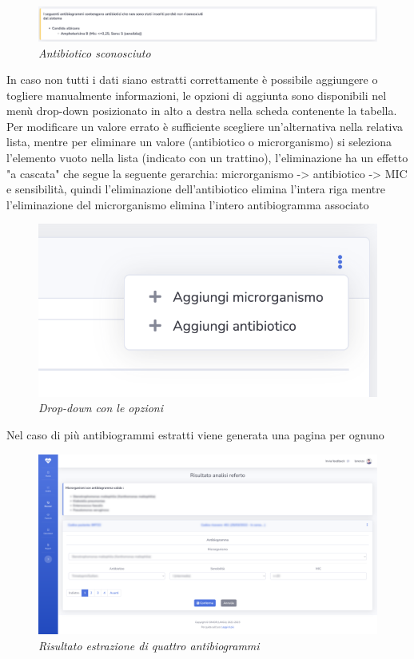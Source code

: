 \begin{figure}[h!]
	\centering
	\includegraphics[width=.99\columnwidth]{images/static_missing_antib.png}
	\caption{\textit{Antibiotico sconosciuto}}
	\label{fig:missing_anti}
\end{figure}
\newpage
In caso non tutti i dati siano estratti correttamente è possibile aggiungere o togliere manualmente informazioni, le opzioni di aggiunta sono disponibili nel menù drop-down posizionato in alto a destra nella scheda contenente la tabella.
Per modificare un valore errato è sufficiente scegliere un'alternativa nella relativa lista, mentre per eliminare un valore (antibiotico o microrganismo) si seleziona l'elemento vuoto nella lista (indicato con un trattino), l'eliminazione ha un effetto 
"a cascata" che segue la seguente gerarchia: microrganismo -> antibiotico -> MIC e sensibilità, quindi l'eliminazione dell'antibiotico elimina l'intera riga mentre l'eliminazione del microrganismo elimina l'intero antibiogramma associato
\begin{figure}[h!]
	\centering
	\includegraphics[width=.99\columnwidth]{images/new_object.png}
	\caption{\textit{Drop-down con le opzioni}}
	\label{fig:new_object}
\end{figure}
\newpage
Nel caso di più antibiogrammi estratti viene generata una pagina per ognuno 
\begin{figure}[h!]
	\centering
	\includegraphics[width=.99\columnwidth]{images/result_multi.png}
	\caption{\textit{Risultato estrazione di quattro antibiogrammi}}
	\label{fig:result_multi}
\end{figure}
\newpage
